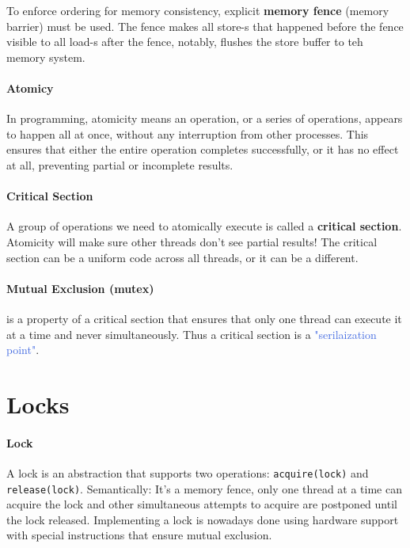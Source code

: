 \documentclass[openany,12pt]{book}
\newcommand{\code}[1]{\texttt{#1}}
\newcommand{\blue}[1]{\textcolor{RoyalBlue}{#1}}
\begin{document}
To enforce ordering for memory consistency, explicit \textbf{memory fence} (memory barrier) must be used. The fence makes all store-s that happened before the fence visible to all load-s after the fence, notably, flushes the store buffer to teh memory system.


\paragraph{Atomicy} In programming, atomicity means an operation, or a series of operations, appears to happen all at once, without any interruption from other processes. This ensures that either the entire operation completes successfully, or it has no effect at all, preventing partial or incomplete results.


\paragraph{Critical Section} A group of operations we need to atomically execute is called a \textbf{critical section}. Atomicity will make sure other threads don't see partial results! The critical section can be a uniform code across all threads, or it can be a different.

\paragraph{Mutual Exclusion (mutex)} is a property of a critical section that ensures that only one thread can execute it at a time and never simultaneously. Thus a critical section is a \blue{"serilaization point"}.



\section*{Locks}

\paragraph{Lock} A lock is an abstraction that supports two operations: \code{acquire(lock)} and \code{release(lock)}.
Semantically: It's a memory fence, only one thread at a time can acquire the lock and other simultaneous attempts to acquire are postponed until the lock released. Implementing a lock is nowadays done using hardware support with special instructions that ensure mutual exclusion.
\end{document}
